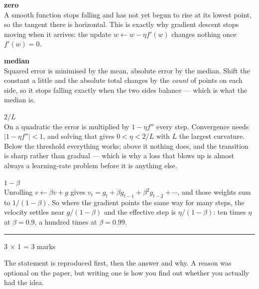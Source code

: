 \documentclass[10pt,a4paper]{article}
\newcommand{\parthead}[2]{\vspace{2pt}\noindent\rule{\linewidth}{0.4pt}\par\vspace{2pt}%
  \noindent{\bfseries Part #1}\hfill{\small #2}\par\vspace{1pt}}
\newcommand{\sol}[1]{\textbf{#1}}
\begin{document}
\begin{sB}

  \item \sol{zero}\\ A smooth function stops falling and has not yet begun to rise at its lowest point, so the tangent there is horizontal. This is exactly why gradient descent stops moving when it arrives: the update $w \leftarrow w - \eta f'(w)$ changes nothing once $f'(w) = 0$.

  \item \sol{median}\\ Squared error is minimised by the mean, absolute error by the median. Shift the constant a little and the absolute total changes by the \emph{count} of points on each side, so it stops falling exactly when the two sides balance --- which is what the median is.

  \item \sol{$2/L$}\\ On a quadratic the error is multiplied by $1 - \eta f''$ every step. Convergence needs $\lvert 1 - \eta f'' \rvert < 1$, and solving that gives $0 < \eta < 2/L$ with $L$ the largest curvature. Below the threshold everything works; above it nothing does, and the transition is sharp rather than gradual --- which is why a loss that blows up is almost always a learning-rate problem before it is anything else.

  \item \sol{$1-\beta$}\\ Unrolling $v \leftarrow \beta v + g$ gives $v_t = g_t + \beta g_{t-1} + \beta^2 g_{t-2} + \cdots$, and those weights sum to $1/(1-\beta)$. So where the gradient points the same way for many steps, the velocity settles near $g/(1-\beta)$ and the effective step is $\eta/(1-\beta)$: ten times $\eta$ at $\beta = 0.9$, a hundred times at $\beta = 0.99$.

\end{sB}

\newpage

\parthead{C --- True or false}{3 $\times$ 1 = 3 marks}

{\small The statement is reproduced first, then the answer and why. A reason was optional on the paper, but writing one is how you find out whether you actually had the idea.}
\end{document}
